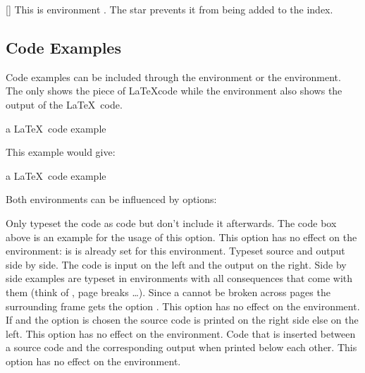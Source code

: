 \documentclass[load-preamble+,babel-options={ngerman,english}]{cnltx-doc}
\begin{document}
\begin{example}
  \begin{environments}
    []
      This is environment .  The star prevents it from being
      added to the index.
  \end{environments}
\end{example}

\subsection{Code Examples}\label{sec:usage:examples}
Code examples can be included through the  environment or the
 environment.  The  only shows the piece of
\LaTeX code while the  environment also shows the output of the
\LaTeX\ code.
\begin{sourcecode}
  \begin{example}
    a \LaTeX\ code example
  \end{example}
\end{sourcecode}
This example would give:

\begin{example}
  a \LaTeX\ code example
\end{example}

Both environments can be influenced by options:
\begin{options}
    Only typeset the code as code but don't include it afterwards.  The
    code box above is an example for the usage of this option.  This option
    has no effect on the  environment: is is already set for
    this environment.
    Typeset source and output side by side.  The code is input on the left and
    the output on the right.  Side by side examples are typeset in
     environments with all consequences that come with them
    (think of , page breaks \ldots).  Since a 
    cannot be broken across pages the surrounding  frame gets
    the option .  This option has no effect on the
     environment.
    If  and the option  is chosen the source
    code is printed on the right side else on the left.  This option has no
    effect on the  environment.
    Code that is inserted between a source code and the corresponding output
    when printed below each other.  This option has no effect on the
     environment.
\end{options}
\end{document}
